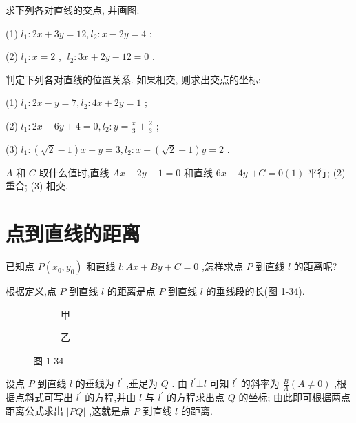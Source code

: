 \documentclass[lang=cn,newtx,12pt,scheme=chinese]{elegantbook}
\begin{document}
\begin{problemset}[练习]

\item 求下列各对直线的交点, 并画图:

(1) \({l}_{1} : {2x} + {3y} = {12},{l}_{2} : x - {2y} = 4\) ;

(2) \({l}_{1} : x = 2\) , \(\;{l}_{2} : {3x} + {2y} - {12} = 0\) .

\item 判定下列各对直线的位置关系. 如果相交, 则求出交点的坐标:

(1) \({l}_{1} : {2x} - y = 7,{l}_{2} : {4x} + {2y} = 1\) ;

(2) \({l}_{1} : {2x} - {6y} + 4 = 0,{l}_{2} : y = \frac{x}{3} + \frac{2}{3}\) ;

(3) \({l}_{1} : \left( {\sqrt{2} - 1}\right) x + y = 3,{l}_{2} : x + \left( {\sqrt{2} + 1}\right) y = 2\) .

\item \(A\) 和 \(C\) 取什么值时,直线 \({Ax} - {2y} - 1 = 0\) 和直线 \({6x} - {4y}\) \(+ C = 0\left( 1\right)\) 平行; (2) 重合; (3) 相交.

\end{problemset}

\section{点到直线的距离}

已知点 \(P\left( {{x}_{0},{y}_{0}}\right)\) 和直线 \(l : {Ax} + {By} + C = 0\) ,怎样求点 \(P\) 到直线 \(l\) 的距离呢?

根据定义,点 \(P\) 到直线 \(l\) 的距离是点 \(P\) 到直线 \(l\) 的垂线段的长(图 1-34).

\begin{figure}[h]
	\centering
	\begin{subfigure}[h]{0.45\textwidth}
		\centering
		
		\caption{甲}
	\end{subfigure}
	\hfill %
	\begin{subfigure}[h]{0.45\textwidth}
		\centering
		
		\caption{乙}
	\end{subfigure}
	\caption{图 1-34}
\end{figure}

设点 \(P\) 到直线 \(l\) 的垂线为 \({l}^{\prime }\) ,垂足为 \(Q\) . 由 \({l}^{\prime } \bot l\) 可知 \({l}^{\prime }\) 的斜率为 \(\frac{B}{A}\left( {A \neq 0}\right)\) ,根据点斜式可写出 \({l}^{\prime }\) 的方程,并由 \(l\) 与 \({l}^{\prime }\) 的方程求出点 \(Q\) 的坐标; 由此即可根据两点距离公式求出 \(\left| {PQ}\right|\) ,这就是点 \(P\) 到直线 \(l\) 的距离.
\end{document}
